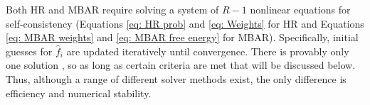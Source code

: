 \documentclass[journal=jced,manuscript=article]{achemso}
\begin{document}

%

Both HR and MBAR require solving a system of $R-1$ nonlinear equations for self-consistency (Equations \ref{eq: HR prob} and \ref{eq: Weights} for HR and Equations \ref{eq: MBAR weights} and \ref{eq: MBAR free energy} for MBAR). Specifically, initial guesses for $\hat f_i$ are updated iteratively until convergence. There is provably only one solution \cite{shirts-chodera:jcp:2008:mbar}, so as long as certain criteria are met that will be discussed below. Thus, although a range of different solver methods exist, the only difference is efficiency and numerical stability.
\end{document}
